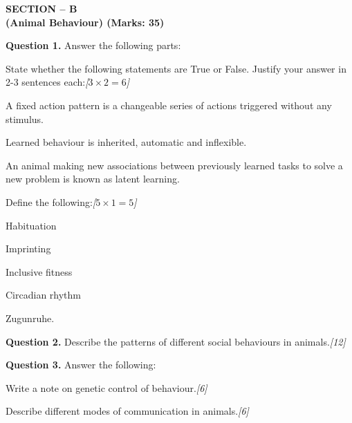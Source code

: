\documentclass[11pt,a4paper]{article}
\newcommand{\pts}[1]{\hfill   \textit{[#1]}}
\begin{document}
\bigskip

\begin{center}
   \textbf{SECTION -- B} \\
   \textbf{(Animal Behaviour) (Marks: 35)}
\end{center}




\noindent   \textbf{Question 1.} Answer the following parts:

\begin{parts}
  \item State whether the following statements are True or False. Justify your answer in 2-3 sentences each:\pts{$3  \times 2 = 6$}
  
\begin{parts}
    \item A fixed action pattern is a changeable series of actions triggered without any stimulus.
    \item Learned behaviour is inherited, automatic and inflexible.
    \item An animal making new associations between previously learned tasks to solve a new problem is known as latent learning.
  \end{parts}
  
  \item Define the following:\pts{$5  \times 1 = 5$}
  
\begin{parts}
    \item Habituation
    \item Imprinting
    \item Inclusive fitness
    \item Circadian rhythm
    \item Zugunruhe.
  \end{parts}
\end{parts}

\medskip


\noindent   \textbf{Question 2.} Describe the patterns of different social behaviours in animals.\pts{12}

\pagebreak

\medskip


\noindent   \textbf{Question 3.} Answer the following:

\begin{parts}
  \item Write a note on genetic control of behaviour.\pts{6}
  \item Describe different modes of communication in animals.\pts{6}
\end{parts}
\end{document}
